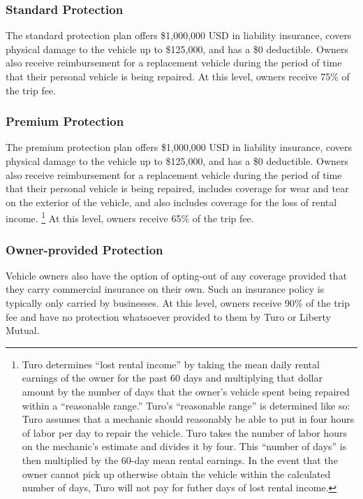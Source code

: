 \documentclass[preprint,12pt]{elsarticle}
\begin{document}
\subsubsection{Standard Protection}
The standard protection plan offers \$1,000,000 USD in liability insurance, covers physical damage to the vehicle up to \$125,000, and has a \$0 deductible. Owners also receive reimbursement for a replacement vehicle during the period of time that their personal vehicle is being repaired. At this level, owners receive 75\% of the trip fee.

\subsubsection{Premium Protection}
The premium protection plan offers \$1,000,000 USD in liability insurance, covers physical damage to the vehicle up to \$125,000, and has a \$0 deductible. Owners also receive reimbursement for a replacement vehicle during the period of time that their personal vehicle is being repaired, includes coverage for wear and tear on the exterior of the vehicle, and also includes coverage for the loss of rental income.
\footnote{Turo determines ``lost rental income'' by taking the mean daily rental earnings of the owner for the past 60 days and multiplying that dollar amount by the number of days that the owner's vehicle spent being repaired within a ``reasonable range.'' Turo's ``reasonable range'' is determined like so: Turo assumes that a mechanic should reasonably be able to put in four hours of labor per day to repair the vehicle. Turo takes the number of labor hours on the mechanic's estimate and divides it by four. This ``number of days'' is then multiplied by the 60-day mean rental earnings. In the event that the owner cannot pick up otherwise obtain the vehicle within the calculated number of days, Turo will not pay for futher days of lost rental income.
}
At this level, owners receive 65\% of the trip fee.

\subsubsection{Owner-provided Protection}
Vehicle owners also have the option of opting-out of any coverage provided that they carry commercial insurance on their own. Such an insurance policy is typically only carried by businesses. At this level, owners receive 90\% of the trip fee and have no protection whatsoever provided to them by Turo or Liberty Mutual.
\end{document}
